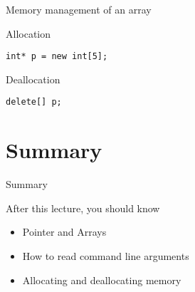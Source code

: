 \documentclass[\classoption]{beamer}
\begin{document}
\begin{frame}[fragile]{Memory management of an array}

\begin{block}{Allocation}
\begin{lstlisting}
int* p = new int[5];
\end{lstlisting}
\end{block}

\begin{block}{Deallocation}
\begin{lstlisting}
delete[] p;
\end{lstlisting}
\end{block}


\end{frame}

\section{Summary}
\begin{frame}{Summary}
\begin{block}{After this lecture, you should know}
\begin{itemize}
\item Pointer and Arrays
\item How to read command line arguments
\item Allocating and deallocating memory
\end{itemize}
\end{block}
\end{frame}
\end{document}
